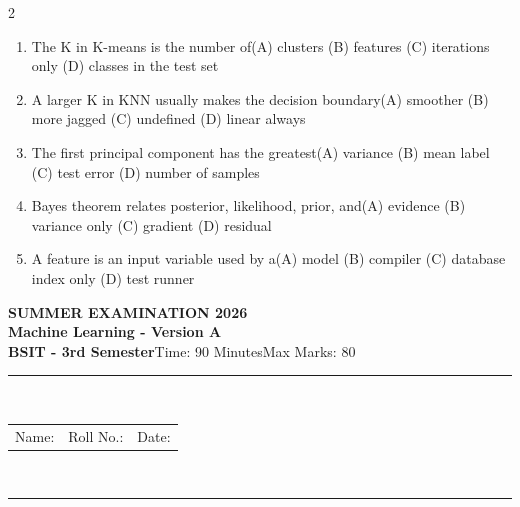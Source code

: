 \documentclass[a4paper]{article}
\makeatletter
\newcommand{\examheader}{%
\begin{center}\textbf{\large SUMMER EXAMINATION 2026}\\[-1pt]
\textbf{\normalsize Machine Learning - Version A}\\[-1pt]
\textbf{BSIT - 3rd Semester}\quad Time: 90 Minutes\quad Max Marks: 80\\[-1pt]
\textcolor{black!65}{\rule{\linewidth}{0.45pt}}\\[-2pt]
\begin{tabularx}{\linewidth}{@{}X X X@{}}Name: \hrulefill & Roll No.: \hrulefill & Date: \hrulefill\end{tabularx}\\[-1pt]
\textcolor{black!65}{\rule{\linewidth}{0.45pt}}\end{center}}
\makeatother
\begin{document}
\begin{multicols*}{2}
\begin{enumerate}
\item The K in K-means is the number of\newline\hspace*{0.6em}(A) clusters \quad (B) features \newline\hspace*{0.6em}(C) iterations only \quad (D) classes in the test set
\item A larger K in KNN usually makes the decision boundary\newline\hspace*{0.6em}(A) smoother \quad (B) more jagged \newline\hspace*{0.6em}(C) undefined \quad (D) linear always
\item The first principal component has the greatest\newline\hspace*{0.6em}(A) variance \quad (B) mean label \newline\hspace*{0.6em}(C) test error \quad (D) number of samples
\item Bayes theorem relates posterior, likelihood, prior, and\newline\hspace*{0.6em}(A) evidence \quad (B) variance only \newline\hspace*{0.6em}(C) gradient \quad (D) residual
\item A feature is an input variable used by a\newline\hspace*{0.6em}(A) model \quad (B) compiler \newline\hspace*{0.6em}(C) database index only \quad (D) test runner
\end{enumerate}
\end{multicols*}
\newpage
\examheader
\raggedcolumns
\end{document}
